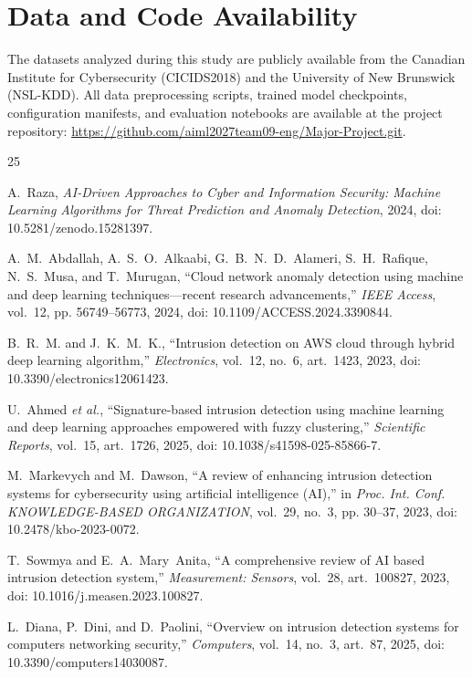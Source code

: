 \documentclass[journal]{IEEEtran}
\begin{document}
\section*{Data and Code Availability}
The datasets analyzed during this study are publicly available from the Canadian Institute for Cybersecurity (CICIDS2018) and the University of New Brunswick (NSL-KDD). All data preprocessing scripts, trained model checkpoints, configuration manifests, and evaluation notebooks are available at the project repository: \url{https://github.com/aiml2027team09-eng/Major-Project.git}.

\begin{thebibliography}{25}

A.~Raza, \textit{AI-Driven Approaches to Cyber and Information Security: Machine Learning Algorithms for Threat Prediction and Anomaly Detection}, 2024, doi: 10.5281/zenodo.15281397.

A.~M.~Abdallah, A.~S.~O.~Alkaabi, G.~B.~N.~D.~Alameri, S.~H.~Rafique, N.~S.~Musa, and T.~Murugan, ``Cloud network anomaly detection using machine and deep learning techniques---recent research advancements,'' \textit{IEEE Access}, vol.~12, pp. 56749--56773, 2024, doi: 10.1109/ACCESS.2024.3390844.

B.~R.~M. and J.~K.~M.~K., ``Intrusion detection on AWS cloud through hybrid deep learning algorithm,'' \textit{Electronics}, vol.~12, no.~6, art.~1423, 2023, doi: 10.3390/electronics12061423.

U.~Ahmed \textit{et al.}, ``Signature-based intrusion detection using machine learning and deep learning approaches empowered with fuzzy clustering,'' \textit{Scientific Reports}, vol.~15, art.~1726, 2025, doi: 10.1038/s41598-025-85866-7.

M.~Markevych and M.~Dawson, ``A review of enhancing intrusion detection systems for cybersecurity using artificial intelligence (AI),'' in \textit{Proc. Int. Conf. KNOWLEDGE-BASED ORGANIZATION}, vol.~29, no.~3, pp. 30--37, 2023, doi: 10.2478/kbo-2023-0072.

T.~Sowmya and E.~A.~Mary~Anita, ``A comprehensive review of AI based intrusion detection system,'' \textit{Measurement: Sensors}, vol.~28, art.~100827, 2023, doi: 10.1016/j.measen.2023.100827.

L.~Diana, P.~Dini, and D.~Paolini, ``Overview on intrusion detection systems for computers networking security,'' \textit{Computers}, vol.~14, no.~3, art.~87, 2025, doi: 10.3390/computers14030087.


\end{thebibliography}
\end{document}
